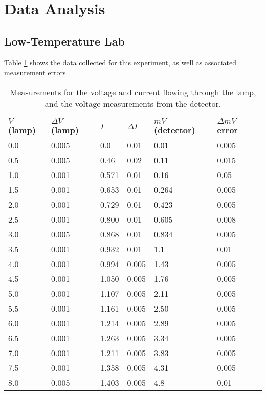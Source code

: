 \documentclass[11pt]{article}
\begin{document}
    \section{Data Analysis}

    \subsection{Low-Temperature Lab}

    Table \ref{hightemp-data} shows the data collected for this experiment, as well as associated measurement errors. 

    \begin{table}[b]
        \begin{tabular}{llllll}
            \hline\hline
            $V$ (lamp) & $\Delta V$ (lamp) & $I$ & $\Delta I$ & $mV$ (detector) & $\Delta mV$ error \\  \hline
            0.0 & 0.005 & 0.0 & 0.01 & 0.01 & 0.005 \\
            0.5 & 0.005 & 0.46 & 0.02 & 0.11 & 0.015 \\
            1.0 & 0.001 & 0.571 & 0.01 & 0.16 & 0.05 \\
            1.5 & 0.001 & 0.653 & 0.01 & 0.264 & 0.005 \\
            2.0 & 0.001 & 0.729 & 0.01 & 0.423 & 0.005 \\
            2.5 & 0.001 & 0.800 & 0.01 & 0.605 & 0.008 \\
            3.0 & 0.005 & 0.868 & 0.01 & 0.834 & 0.005 \\
            3.5 & 0.001 & 0.932 & 0.01 & 1.1 & 0.01 \\
            4.0 & 0.001 & 0.994 & 0.005 & 1.43 & 0.005 \\
            4.5 & 0.001 & 1.050 & 0.005 & 1.76 & 0.005 \\
            5.0 & 0.001 & 1.107 & 0.005 & 2.11 & 0.005 \\
            5.5 & 0.001 & 1.161 & 0.005 & 2.50 & 0.005 \\
            6.0 & 0.001 & 1.214 & 0.005 & 2.89 & 0.005 \\
            6.5 & 0.001 & 1.263 & 0.005 & 3.34 & 0.005 \\
            7.0 & 0.001 & 1.211 & 0.005 & 3.83 & 0.005 \\
            7.5 & 0.001 & 1.358 & 0.005 & 4.31 & 0.005 \\
            8.0 & 0.005 & 1.403 & 0.005 & 4.8 & 0.01 \\ \hline \hline
        \end{tabular}
        \caption{Measurements for the voltage and current flowing through the lamp, and the voltage measurements from the detector.}
        \label{hightemp-data}

    \end{table}
\end{document}
